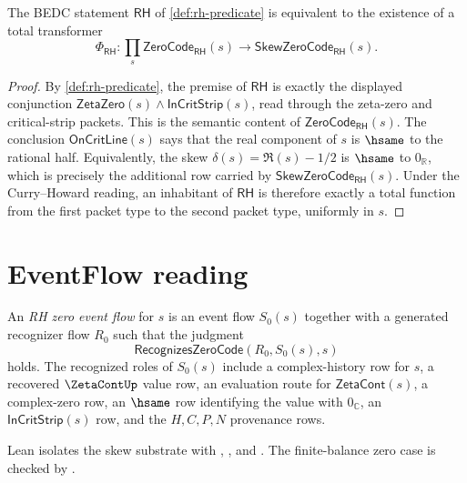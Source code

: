 \begin{proposition}
\label{prop:rh-zero-skew-form}
The BEDC statement $\mathsf{RH}$ of \autoref{def:rh-predicate} is equivalent
to the existence of a total transformer
$$
\Phi_{\mathsf{RH}}:
\prod_s
\mathsf{ZeroCode}_{\mathsf{RH}}(s)
\to
\mathsf{SkewZeroCode}_{\mathsf{RH}}(s).
$$
\end{proposition}

\begin{proof}
By \autoref{def:rh-predicate}, the premise of $\mathsf{RH}$ is exactly the
displayed conjunction $\mathsf{ZetaZero}(s)\wedge\mathsf{InCritStrip}(s)$,
read through the zeta-zero and critical-strip packets.  This is the semantic
content of $\mathsf{ZeroCode}_{\mathsf{RH}}(s)$.  The conclusion
$\mathsf{OnCritLine}(s)$ says that the real component of $s$ is $\hsame$ to
the rational half.  Equivalently, the skew $\delta(s)=\Re(s)-1/2$ is
$\hsame$ to $0_{\mathbb R}$, which is precisely the additional row carried by
$\mathsf{SkewZeroCode}_{\mathsf{RH}}(s)$.  Under the Curry--Howard reading,
an inhabitant of $\mathsf{RH}$ is therefore exactly a total function from the
first packet type to the second packet type, uniformly in $s$.
\end{proof}

\section{EventFlow reading}
\label{sec:rh-eventflow-reading}

\begin{definition}
\label{def:rh-zero-event-flow}
An \emph{RH zero event flow} for $s$ is an event flow $S_0(s)$ together with a
generated recognizer flow $R_0$ such that the judgment
$$
\mathsf{RecognizesZeroCode}(R_0,S_0(s),s)
$$
holds.  The recognized roles of $S_0(s)$ include a complex-history row for
$s$, a recovered $\ZetaContUp$ value row, an evaluation route for
$\mathsf{ZetaCont}(s)$, a complex-zero row, an $\hsame$ row identifying the
value with $0_{\mathbb C}$, an $\mathsf{InCritStrip}(s)$ row, and the
$H,C,P,N$ provenance rows.
\end{definition}

Lean isolates the skew substrate with
,
, and
.
The finite-balance zero case is checked by
.

